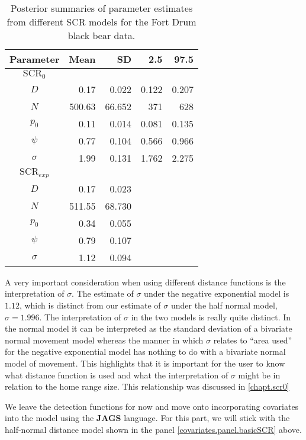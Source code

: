 \begin{table}[ht]
\centering
\caption{Posterior summaries of parameter estimates from different SCR models for the Fort Drum black bear data.}
\begin{tabular}{crrrr}
\hline \hline
Parameter & Mean & SD & 2.5 & 97.5 \\
\hline

$\mbox{SCR}_0$&   &      &           &        \\
\hline
$D$    &   0.17   & 0.022     &  0.122 & 0.207  \\
$N$    &  500.63 & 66.652  & 371   & 628       \\
$p_0$  &    0.11  & 0.014   & 0.081& 0.135     \\
$\psi$  &   0.77  & 0.104    & 0.566 & 0.966    \\
$\sigma$ &  1.99 & 0.131  &1.762 & 2.275     \\

$\mbox{SCR}_{exp}$&   &      &          &        \\
\hline
$D$  &   0.17 &  0.023  &				& 		 \\
$N$   &  511.55 &  68.730  &			& 		 \\
$p_0$  &    0.34 &   0.055  &			& 		 \\
$\psi$  &   0.79  &  0.107  &			& 		 \\
$\sigma$ &  1.12  & 0.094  &			& 		 \\
\end{tabular}
\label{covariates.tab.SCR0exp}
\end{table}

A very important consideration when using different distance functions is the
interpretation of $\sigma$.  The estimate of $\sigma$ under the negative exponential model is
$1.12$, which is distinct from our
estimate of $\sigma$ under the half normal model, $\sigma = 1.996$.
The interpretation
of $\sigma$ in the two models is really quite distinct. In the normal
model it can be interpreted as the standard deviation of a bivariate
normal movement model whereas the manner in which $\sigma$ relates to
``area used'' for the negative exponential model has nothing to do
with a bivariate normal model of movement.  This highlights that it is
important for the user to know what distance function is used and what
the interpretation of $\sigma$ might be in relation to the home range size.
This relationship was discussed in \ref{chapt.scr0}

We leave the detection functions for now and move onto incorporating
covariates into the model using the {\bf JAGS}
language.  For this part, we will stick with the half-normal distance
model shown in the panel \ref{covariates.panel.basicSCR} above.


